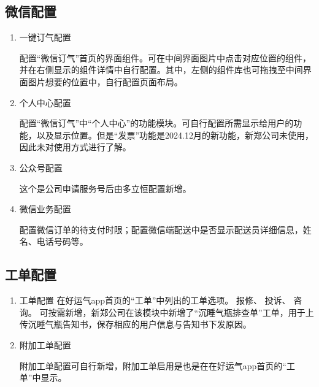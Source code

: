 \documentclass[UTF8]{ctexart}
\begin{document}
\subsection{微信配置}
\begin{enumerate}
	\item 一键订气配置
	
	配置“微信订气”首页的界面组件。可在中间界面图片中点击对应位置的组件，并在右侧显示的组件详情中自行配置。其中，左侧的组件库也可拖拽至中间界面图片想要的位置中，自行配置页面布局。
	
	\item 个人中心配置
	
	配置“微信订气”中“个人中心”的功能模块。可自行配置所需显示给用户的功能，以及显示位置。但是“发票”功能是2024.12月的新功能，新郑公司未使用，因此未对使用方式进行了解。
	
	\item 公众号配置
	
	这个是公司申请服务号后由多立恒配置新增。
	
	\item 微信业务配置
	
	配置微信订单的待支付时限；配置微信端配送中是否显示配送员详细信息，姓名、电话号码等。
\end{enumerate}


\subsection{工单配置}
\begin{enumerate}
	\item 工单配置
	在好运气app首页的“工单”中列出的工单选项。
	报修、
	投诉、
	咨询。
	可按需新增，新郑公司在该模块中新增了“沉睡气瓶排查单”工单，用于上传沉睡气瓶告知书，保存相应的用户信息与告知书下发原因。
	
	\item 附加工单配置
	
	附加工单配置可自行新增，附加工单启用是也是在在好运气app首页的“工单”中显示。
	
	
\end{enumerate}
\end{document}
